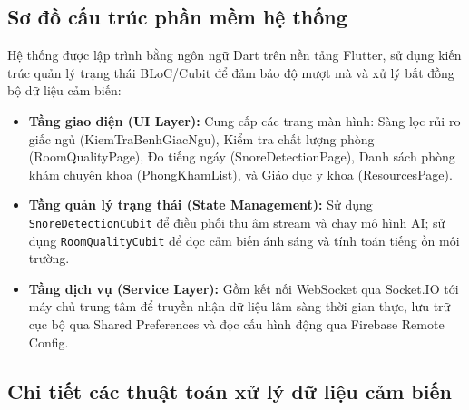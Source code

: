 \documentclass[12pt,a4paper]{article}
\begin{document}
\subsection{Sơ đồ cấu trúc phần mềm hệ thống}
Hệ thống được lập trình bằng ngôn ngữ Dart trên nền tảng Flutter, sử dụng kiến trúc quản lý trạng thái BLoC/Cubit để đảm bảo độ mượt mà và xử lý bất đồng bộ dữ liệu cảm biến:
\begin{itemize}
    \item \textbf{Tầng giao diện (UI Layer):} Cung cấp các trang màn hình: Sàng lọc rủi ro giấc ngủ (KiemTraBenhGiacNgu), Kiểm tra chất lượng phòng (RoomQualityPage), Đo tiếng ngáy (SnoreDetectionPage), Danh sách phòng khám chuyên khoa (PhongKhamList), và Giáo dục y khoa (ResourcesPage).
    \item \textbf{Tầng quản lý trạng thái (State Management):} Sử dụng \texttt{SnoreDetectionCubit} để điều phối thu âm stream và chạy mô hình AI; sử dụng \texttt{RoomQualityCubit} để đọc cảm biến ánh sáng và tính toán tiếng ồn môi trường.
    \item \textbf{Tầng dịch vụ (Service Layer):} Gồm kết nối WebSocket qua Socket.IO tới máy chủ trung tâm để truyền nhận dữ liệu lâm sàng thời gian thực, lưu trữ cục bộ qua Shared Preferences và đọc cấu hình động qua Firebase Remote Config.
\end{itemize}

\subsection{Chi tiết các thuật toán xử lý dữ liệu cảm biến}
\end{document}
